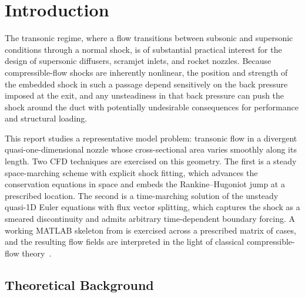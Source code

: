 \section{Introduction} \label{sec:introduction}

The transonic regime, where a flow transitions between subsonic and supersonic conditions through a normal shock, is of substantial practical interest for the design of supersonic diffusers, scramjet inlets, and rocket nozzles. Because compressible-flow shocks are inherently nonlinear, the position and strength of the embedded shock in such a passage depend sensitively on the back pressure imposed at the exit, and any unsteadiness in that back pressure can push the shock around the duct with potentially undesirable consequences for performance and structural loading.

This report studies a representative model problem: transonic flow in a divergent quasi-one-dimensional nozzle whose cross-sectional area varies smoothly along its length. Two CFD techniques are exercised on this geometry. The first is a steady space-marching scheme with explicit shock fitting, which advances the conservation equations in space and embeds the Rankine--Hugoniot jump at a prescribed location. The second is a time-marching solution of the unsteady quasi-1D Euler equations with flux vector splitting, which captures the shock as a smeared discontinuity and admits arbitrary time-dependent boundary forcing. A working MATLAB skeleton from \textcite{jbaeder2026matlab} is exercised across a prescribed matrix of cases, and the resulting flow fields are interpreted in the light of classical compressible-flow theory~\autocite{danderson2023fundamentals}.

\subsection{Theoretical Background} \label{sec:introduction/theory}

